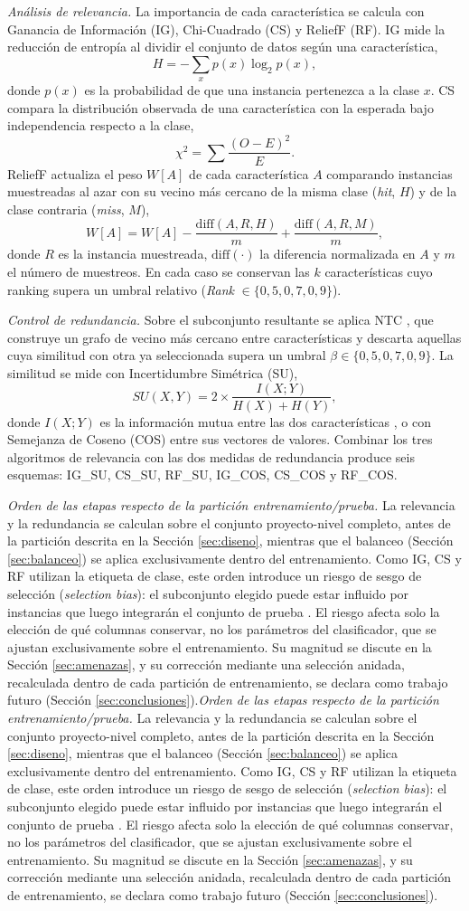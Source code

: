 \documentclass[conference,a4paper]{IEEEtran}
\newif\ifmarcarcambios
\newcommand{\cambio}[1]{\ifmarcarcambios\ifvmode\leavevmode\fi{\color{azulcambio}#1}\else#1\fi}
\begin{document}
\textit{Análisis de relevancia.} La importancia de cada característica se calcula con Ganancia de Información (IG), Chi-Cuadrado (CS) y ReliefF (RF). IG mide la reducción de entropía al dividir el conjunto de datos según una característica,
\begin{equation}
H = -\sum_{x} p(x)\log_{2}p(x),
\label{eq:entropia}
\end{equation}
donde $p(x)$ es la probabilidad de que una instancia pertenezca a la clase $x$. CS compara la distribución observada de una característica con la esperada bajo independencia respecto a la clase,
\begin{equation}
\chi^{2} = \sum \frac{(O-E)^{2}}{E}.
\label{eq:chisqr}
\end{equation}
ReliefF actualiza el peso $W[A]$ de cada característica $A$ comparando instancias muestreadas al azar con su vecino más cercano de la misma clase (\textit{hit}, $H$) y de la clase contraria (\textit{miss}, $M$),
\begin{equation}
W[A] = W[A] - \frac{\mathrm{diff}(A,R,H)}{m} + \frac{\mathrm{diff}(A,R,M)}{m},
\label{eq:relief}
\end{equation}
donde $R$ es la instancia muestreada, $\mathrm{diff}(\cdot)$ la diferencia normalizada en $A$ y $m$ el número de muestreos. En cada caso se conservan las $k$ características cuyo ranking supera un umbral relativo (\textit{Rank} $\in \{0{,}5, 0{,}7, 0{,}9\}$).

\textit{Control de redundancia.} Sobre el subconjunto resultante se aplica NTC \cite{liu2015}, que construye un grafo de vecino más cercano entre características y descarta aquellas cuya similitud con otra ya seleccionada supera un umbral $\beta \in \{0{,}5, 0{,}7, 0{,}9\}$. La similitud se mide con Incertidumbre Simétrica (SU),
\begin{equation}
SU(X,Y) = 2 \times \frac{I(X;Y)}{H(X)+H(Y)},
\label{eq:su}
\end{equation}
donde $I(X;Y)$ es la información mutua entre las dos características \cite{yu2003}, o con Semejanza de Coseno (COS) entre sus vectores de valores. Combinar los tres algoritmos de relevancia con las dos medidas de redundancia produce seis esquemas: IG\_SU, CS\_SU, RF\_SU, IG\_COS, CS\_COS y RF\_COS.

\cambio{\textit{Orden de las etapas respecto de la partición entrenamiento/prueba.} La relevancia y la redundancia se calculan sobre el conjunto proyecto-nivel completo, antes de la partición descrita en la Sección \ref{sec:diseno}, mientras que el balanceo (Sección \ref{sec:balanceo}) se aplica exclusivamente dentro del entrenamiento. Como IG, CS y RF utilizan la etiqueta de clase, este orden introduce un riesgo de sesgo de selección (\textit{selection bias}): el subconjunto elegido puede estar influido por instancias que luego integrarán el conjunto de prueba \cite{ambroise2002,cawley2010}. El riesgo afecta solo la elección de qué columnas conservar, no los parámetros del clasificador, que se ajustan exclusivamente sobre el entrenamiento. Su magnitud se discute en la Sección \ref{sec:amenazas}, y su corrección mediante una selección anidada, recalculada dentro de cada partición de entrenamiento, se declara como trabajo futuro (Sección \ref{sec:conclusiones}).}
\end{document}
